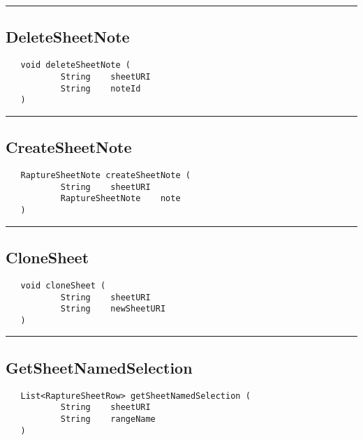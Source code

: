\rule{15cm}{2pt}
\subsection{DeleteSheetNote}
\label{Api:DeleteSheetNote}
\begin{verbatim}
   void deleteSheetNote (
           String    sheetURI
           String    noteId
   )
\end{verbatim}



\rule{15cm}{2pt}
\subsection{CreateSheetNote}
\label{Api:CreateSheetNote}
\begin{verbatim}
   RaptureSheetNote createSheetNote (
           String    sheetURI
           RaptureSheetNote    note
   )
\end{verbatim}



\rule{15cm}{2pt}
\subsection{CloneSheet}
\label{Api:CloneSheet}
\begin{verbatim}
   void cloneSheet (
           String    sheetURI
           String    newSheetURI
   )
\end{verbatim}



\rule{15cm}{2pt}
\subsection{GetSheetNamedSelection}
\label{Api:GetSheetNamedSelection}
\begin{verbatim}
   List<RaptureSheetRow> getSheetNamedSelection (
           String    sheetURI
           String    rangeName
   )
\end{verbatim}



